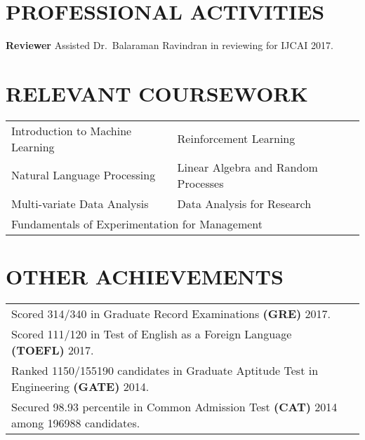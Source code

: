 \documentclass[margin,11pt]{res}
\begin{document}
\begin{resume}

\section{PROFESSIONAL ACTIVITIES}
\textbf{Reviewer} 
Assisted Dr.~Balaraman Ravindran in reviewing for IJCAI 2017.\\


\section{RELEVANT COURSEWORK}
\begin{tabular}{ll}
Introduction to Machine Learning & Reinforcement Learning  \\
Natural Language Processing & Linear Algebra and Random Processes \\
Multi-variate Data Analysis & Data Analysis for Research \\
\multicolumn{2}{l}{Fundamentals of Experimentation for Management}
\end{tabular}

\section{OTHER ACHIEVEMENTS}
\begin{tabular}{p{12cm}p{80cm}}
Scored 314/340 in Graduate Record Examinations \textbf{(GRE)} 2017.\\
Scored 111/120 in Test of English as a Foreign Language \textbf{(TOEFL)} 2017.\\
Ranked 1150/155190 candidates in Graduate Aptitude Test in Engineering \textbf{(GATE)} 2014. \\
Secured 98.93 percentile in Common Admission Test \textbf{(CAT)} 2014 among 196988 candidates.
\end{tabular}

\newpage

\end{resume}
\end{document}
